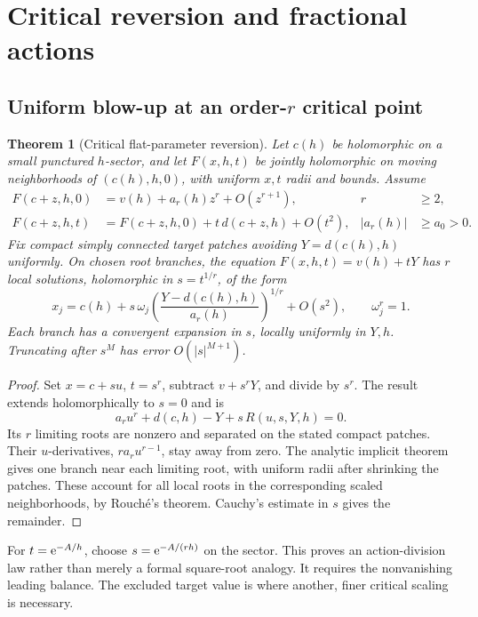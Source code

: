 \documentclass[11pt,a4paper]{article}
\numberwithin{equation}{section}
\newtheorem{theorem}{Theorem}[section]
\theoremstyle{definition}
\theoremstyle{remark}\newtheorem{remark}[theorem]{Remark}
\begin{document}
\section{Critical reversion and fractional actions}
\label{sec:critical-general}

\subsection{Uniform blow-up at an order-\texorpdfstring{$r$}{r} critical point}
\begin{theorem}[Critical flat-parameter reversion]\label{thm:critical}
Let $c(h)$ be holomorphic on a small punctured $h$-sector, and let
$F(x,h,t)$ be jointly holomorphic on moving neighborhoods of
$(c(h),h,0)$, with uniform $x,t$ radii and bounds. Assume
\begin{align}
 F(c+z,h,0)&=v(h)+a_r(h)z^r+O(z^{r+1}),
     &r&\ge2,\label{eq:critical-core}\\
 F(c+z,h,t)&=F(c+z,h,0)+t\,d(c+z,h)+O(t^2),
     &|a_r(h)|&\ge a_0>0.\label{eq:critical-perturb}
\end{align}
Fix compact simply connected target patches avoiding
$Y=d(c(h),h)$ uniformly. On chosen root branches, the equation
$F(x,h,t)=v(h)+tY$ has $r$ local solutions, holomorphic in
$s=t^{1/r}$, of the form
\begin{equation}\label{eq:critical-root}
 x_j=c(h)+s\,\omega_j
 \left(\frac{Y-d(c(h),h)}{a_r(h)}\right)^{1/r}+O(s^2),
 \qquad \omega_j^r=1.
\end{equation}
Each branch has a convergent expansion in $s$, locally uniformly in
$Y,h$. Truncating after $s^M$ has error $O(|s|^{M+1})$.
\end{theorem}
\begin{proof}
Set $x=c+su$, $t=s^r$, subtract $v+s^rY$, and divide by $s^r$.
The result extends holomorphically to $s=0$ and is
\[
 a_r u^r+d(c,h)-Y+s\,R(u,s,Y,h)=0.
\]
Its $r$ limiting roots are nonzero and separated on the stated compact
patches. Their $u$-derivatives, $r a_r u^{r-1}$, stay away from zero.
The analytic implicit theorem gives one branch near each limiting root,
with uniform radii after shrinking the patches. These account for all
local roots in the corresponding scaled neighborhoods, by Rouch\'e's
theorem. Cauchy's estimate in $s$ gives the remainder.
\end{proof}
For $t=\mathrm e^{-A/h}$, choose $s=\mathrm e^{-A/(rh)}$ on the sector. This proves
an action-division law rather than merely a formal square-root analogy.
It requires the nonvanishing leading balance. The excluded target value
is where another, finer critical scaling is necessary.
\end{document}
